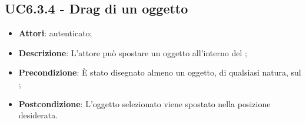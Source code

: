 \subsection{UC6.3.4 - Drag di un oggetto}
\label{ssec:UC6.3.4}
\begin{itemize}
\item \textbf{Attori}:  autenticato;
\item \textbf{Descrizione}: L'attore può spostare un oggetto all'interno del ;
\item \textbf{Precondizione}: È stato disegnato almeno un oggetto, di qualsiasi natura, sul ;
\item \textbf{Postcondizione}: L'oggetto selezionato viene spostato nella posizione desiderata.
\end{itemize}
\newpage
